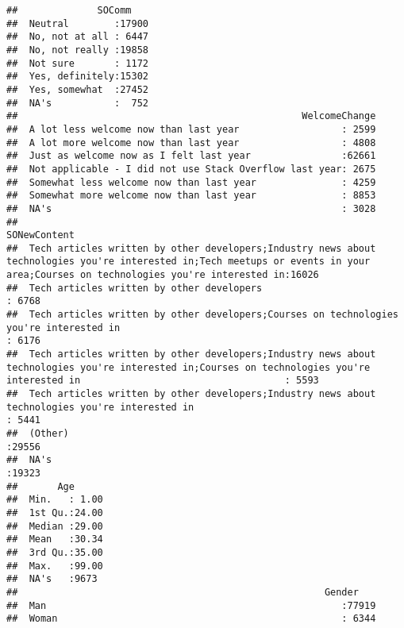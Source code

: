 \documentclass[]{article}
\begin{document}
\begin{verbatim}
##              SOComm     
##  Neutral        :17900  
##  No, not at all : 6447  
##  No, not really :19858  
##  Not sure       : 1172  
##  Yes, definitely:15302  
##  Yes, somewhat  :27452  
##  NA's           :  752  
##                                                  WelcomeChange  
##  A lot less welcome now than last year                  : 2599  
##  A lot more welcome now than last year                  : 4808  
##  Just as welcome now as I felt last year                :62661  
##  Not applicable - I did not use Stack Overflow last year: 2675  
##  Somewhat less welcome now than last year               : 4259  
##  Somewhat more welcome now than last year               : 8853  
##  NA's                                                   : 3028  
##                                                                                                                                                                            SONewContent  
##  Tech articles written by other developers;Industry news about technologies you're interested in;Tech meetups or events in your area;Courses on technologies you're interested in:16026  
##  Tech articles written by other developers                                                                                                                                       : 6768  
##  Tech articles written by other developers;Courses on technologies you're interested in                                                                                          : 6176  
##  Tech articles written by other developers;Industry news about technologies you're interested in;Courses on technologies you're interested in                                    : 5593  
##  Tech articles written by other developers;Industry news about technologies you're interested in                                                                                 : 5441  
##  (Other)                                                                                                                                                                         :29556  
##  NA's                                                                                                                                                                            :19323  
##       Age       
##  Min.   : 1.00  
##  1st Qu.:24.00  
##  Median :29.00  
##  Mean   :30.34  
##  3rd Qu.:35.00  
##  Max.   :99.00  
##  NA's   :9673   
##                                                      Gender     
##  Man                                                    :77919  
##  Woman                                                  : 6344  

\end{verbatim}
\end{document}
